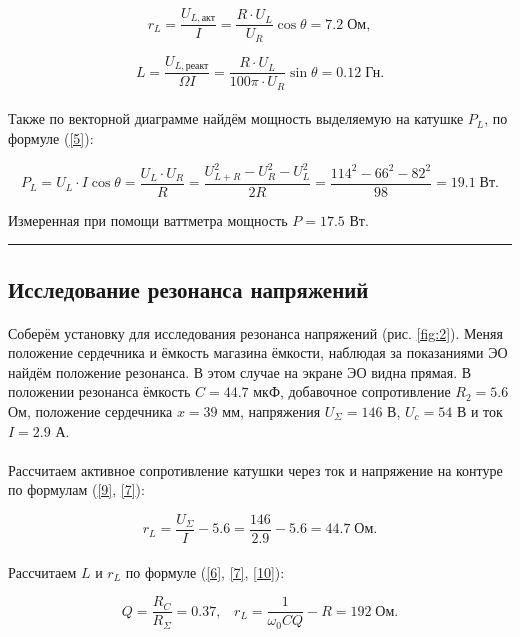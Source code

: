 \documentclass[a4paper,12pt]{article} %
\begin{document}
\[ r_L = \frac{U_{L, \text{акт}}}{I} = \frac{R \cdot U_L}{U_R} \cos \theta = 7.2 \; \text{Ом},
\]

\[ L = \frac{U_{L, \text{реакт}}}{\Omega I} = \frac{R \cdot U_L}{100 \pi \cdot U_R} \sin \theta = 0.12 \; \text{Гн}.
\]

\paragraph{} Также по векторной диаграмме найдём мощность выделяемую на катушке $P_L$, по формуле (\ref{5}):

\[ P_L = U_L \cdot I \cos \theta = \frac{U_L \cdot U_R}{R} = \frac{U_{L+R}^2 - U_R^2 - U_L^2}{2R} = \frac{114^2 - 66^2 - 82^2}{98} = 19.1 \; \text{Вт}.
\] 

\noindent Измеренная при помощи ваттметра мощность $P = 17.5$ Вт.

\medskip\hrule\medskip

\subsection{Исследование резонанса напряжений}

\paragraph{} Соберём установку для исследования резонанса напряжений (рис. \ref{fig:2}). Меняя положение сердечника и ёмкость магазина ёмкости, наблюдая за показаниями ЭО найдём положение резонанса. В этом случае на экране ЭО видна прямая. В положении резонанса ёмкость $C = 44.7$ мкФ, добавочное сопротивление $R_2 = 5.6$ Ом, положение сердечника $x = 39$ мм, напряжения $U_\Sigma = 146$ В, $U_c = 54$ В и ток $I = 2.9$ А.

\paragraph{} Рассчитаем активное сопротивление катушки через ток и напряжение на контуре по формулам (\ref{9}, \ref{7}):

\[ r_L = \frac{U_\Sigma}{I} - 5.6 = \frac{146}{2.9} - 5.6 = 44.7 \; \text{Ом}. 
\] 

\paragraph{} Рассчитаем $L$ и $r_L$ по формуле (\ref{6}, \ref{7}, \ref{10}):

\[ Q = \frac{R_C}{R_\Sigma} = 0.37, \;\;\; r_L = \frac{1}{\omega_0 C Q} - R = 192 \; \text{Ом}.
\]
\end{document}
